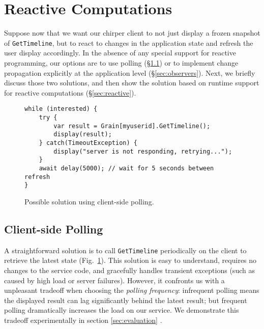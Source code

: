 \section{Reactive Computations}\label{sec:formulation}

Suppose now that we want our chirper client to not just display a frozen snapshot of \lstinline|GetTimeline|, but to react to changes in the application state and refresh the user display accordingly. In the absence of any special support for reactive programming, our options are to use polling (\S\ref{sec:polling}) or to implement change propagation explicitly at the application level (\S\ref{sec:observers}). Next, we briefly discuss those two solutions, and then show the solution based on runtime support for reactive computations (\S\ref{sec:reactive}). 

\begin{figure}
\begin{lstlisting}
while (interested) {
	try {
		var result = Grain[myuserid].GetTimeline();
		display(result);
	} catch(TimeoutException) { 
		display("server is not responding, retrying...");
	}  
	await delay(5000); // wait for 5 seconds between refresh
}
\end{lstlisting}
\caption{Possible solution using client-side polling.}\label{fig:polling}
\end{figure}

\subsection{Client-side Polling}\label{sec:polling}

 A straightforward solution is to call \lstinline|GetTimeline| periodically on the client to retrieve the latest state (Fig.~\ref{fig:polling}). This solution is easy to understand, requires no changes to the service code, and gracefully handles transient exceptions (such as caused by high load or server failures). However, it confronts us with a unpleasant tradeoff when choosing the \emph{polling frequency}: infrequent polling means the displayed result can lag significantly behind the latest result; but frequent polling dramatically increases the load on our service. We demonstrate this tradeoff experimentally in section \ref{sec:evaluation} .

